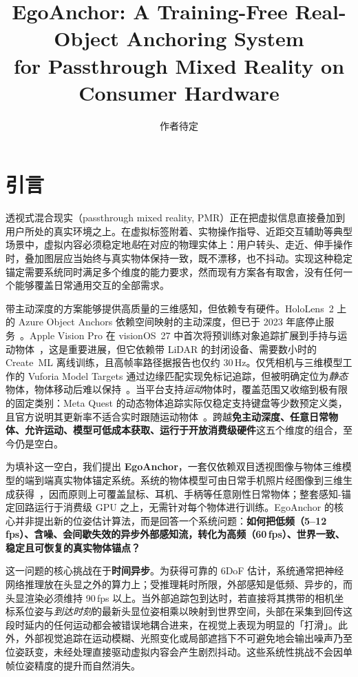 \documentclass[review]{vgtc}
\title{EgoAnchor: A Training-Free Real-Object Anchoring System \\ for Passthrough Mixed Reality on Consumer Hardware}
\author{作者待定}
\begin{document}
\maketitle

\section{引言}

透视式混合现实（passthrough mixed reality, PMR）正在把虚拟信息直接叠加到用户所处的真实环境之上。在虚拟标签附着、实物操作指导、近距交互辅助等典型场景中，虚拟内容必须稳定地\emph{贴}在对应的物理实体上：用户转头、走近、伸手操作时，叠加图层应当始终与真实物体保持一致，既不漂移，也不抖动。实现这种稳定锚定需要系统同时满足多个维度的能力要求，然而现有方案各有取舍，没有任何一个能够覆盖日常通用交互的全部需求。


带主动深度的方案能够提供高质量的三维感知，但依赖专有硬件。HoloLens~2 上的 Azure Object Anchors 依赖空间映射的主动深度，但已于 2023 年底停止服务~\cite{azureObjectAnchors}。Apple Vision Pro 在 visionOS~27 中首次将预训练对象追踪扩展到手持与运动物体~\cite{appleVisionOS27ObjectTracking}，这是重要进展，但它依赖带 LiDAR 的封闭设备、需要数小时的 Create~ML 离线训练，且高帧率路径据报告也仅约 30\,Hz。仅凭相机与三维模型工作的 Vuforia Model Targets 通过边缘匹配实现免标记追踪，但被明确定位为\emph{静态}物体，物体移动后难以保持~\cite{vuforiaModelTargets}。当平台支持\emph{运动}物体时，覆盖范围又收缩到极有限的固定类别：Meta Quest 的动态物体追踪实际仅稳定支持键盘等少数预定义类，且官方说明其更新率不适合实时跟随运动物体~\cite{metaDynamicObjectTracker,metaSceneOverview}。跨越\textbf{免主动深度、任意日常物体、允许运动、模型可低成本获取、运行于开放消费级硬件}这五个维度的组合，至今仍是空白。

为填补这一空白，我们提出 \textbf{EgoAnchor}，一套仅依赖双目透视图像与物体三维模型的端到端真实物体锚定系统。系统的物体模型可由日常手机照片经图像到三维生成获得~\cite{trellis2024,appleObjectCapture}，因而原则上可覆盖鼠标、耳机、手柄等任意刚性日常物体；整套感知-锚定回路运行于消费级 GPU 之上，无需针对每个物体进行训练。EgoAnchor 的核心并非提出新的位姿估计算法，而是回答一个系统问题：\textbf{如何把低频（5--12\,fps）、含噪、会间歇失效的异步外部感知流，转化为高频（60\,fps）、世界一致、稳定且可恢复的真实物体锚点？}

这一问题的核心挑战在于\textbf{时间异步}。为获得可靠的 6DoF 估计，系统通常把神经网络推理放在头显之外的算力上；受推理耗时所限，外部感知是低频、异步的，而头显渲染必须维持 90\,fps 以上。当外部追踪包到达时，若直接将其携带的相机坐标系位姿与\emph{到达时刻}的最新头显位姿相乘以映射到世界空间，头部在采集到回传这段时延内的任何运动都会被错误地耦合进来，在视觉上表现为明显的「打滑」。此外，外部视觉追踪在运动模糊、光照变化或局部遮挡下不可避免地会输出噪声乃至位姿跃变，未经处理直接驱动虚拟内容会产生剧烈抖动。这些系统性挑战不会因单帧位姿精度的提升而自然消失。
\end{document}
